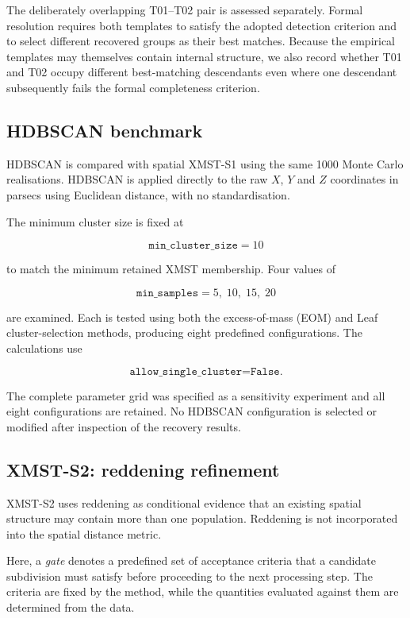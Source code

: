 \documentclass[fleqn,usenatbib]{rasti}
\begin{document}
The deliberately overlapping T01--T02 pair is assessed separately. Formal
resolution requires both templates to satisfy the adopted detection
criterion and to select different recovered groups as their best matches.
Because the empirical templates may themselves contain internal structure,
we also record whether T01 and T02 occupy different best-matching
descendants even where one descendant subsequently fails the formal
completeness criterion.


\subsection{HDBSCAN benchmark}

HDBSCAN is compared with spatial XMST-S1 using the same 1000 Monte Carlo
realisations. HDBSCAN is applied directly to the raw $X$, $Y$ and $Z$
coordinates in parsecs using Euclidean distance, with no standardisation.

The minimum cluster size is fixed at

\[
\texttt{min\_cluster\_size}=10
\]

to match the minimum retained XMST membership. Four values of

\[
\texttt{min\_samples}=5,\;10,\;15,\;20
\]

are examined. Each is tested using both the excess-of-mass (EOM) and Leaf
cluster-selection methods, producing eight predefined configurations. The
calculations use

\[
\texttt{allow\_single\_cluster=False}.
\]

The complete parameter grid was specified as a sensitivity experiment and
all eight configurations are retained. No HDBSCAN configuration is selected
or modified after inspection of the recovery results.


\subsection{XMST-S2: reddening refinement}
\label{sec:s2_method}

XMST-S2 uses reddening as conditional evidence that an existing spatial
structure may contain more than one population. Reddening is not
incorporated into the spatial distance metric.

Here, a \emph{gate} denotes a predefined set of acceptance criteria that a
candidate subdivision must satisfy before proceeding to the next processing
step. The criteria are fixed by the method, while the quantities evaluated
against them are determined from the data.
\end{document}
